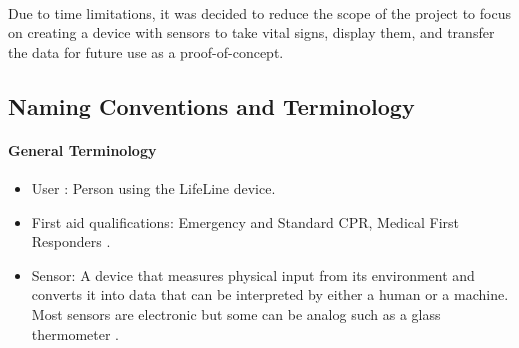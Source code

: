 \documentclass{article}
\begin{document}
    \paragraph{}
	Due to time limitations, it was decided to reduce the scope of the project to focus on creating a device with sensors to take vital signs, display them, and transfer the data for future use as a proof-of-concept.
	
	\newpage
	\subsection{Naming Conventions and Terminology}
    \paragraph{General Terminology}
	\begin{itemize}
	    \item User : Person using the LifeLine device. 
	    \item First aid qualifications: Emergency and Standard CPR, Medical First Responders \citep{sja}.
	    \item Sensor: A device that measures physical input from its environment and converts it into data that can be interpreted by either a human or a machine. Most sensors are electronic but some can be analog such as a glass thermometer \citep{sensor}. 
    \end{itemize}
    
\end{document}
